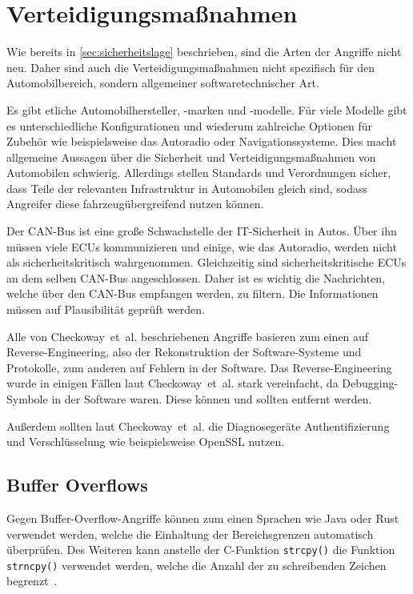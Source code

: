 \chapter{Verteidigungsmaßnahmen}\label{ch:defense}
Wie bereits in \cref{sec:sicherheitslage} beschrieben, sind die Arten der
Angriffe nicht neu. Daher sind auch die Verteidigungsmaßnahmen nicht
spezifisch für den Automobilbereich, sondern allgemeiner softwaretechnischer
Art.

Es gibt etliche Automobilhersteller, -marken und -modelle. Für viele Modelle
gibt es unterschiedliche Konfigurationen und wiederum zahlreiche Optionen für
Zubehör wie beispielsweise das Autoradio oder Navigationssysteme. Dies macht
allgemeine Aussagen über die Sicherheit und Verteidigungsmaßnahmen von
Automobilen schwierig. Allerdings stellen Standards und Verordnungen sicher,
dass Teile der relevanten Infrastruktur in Automobilen gleich sind, sodass
Angreifer diese fahrzeugübergreifend nutzen können.

Der CAN-Bus ist eine große Schwachstelle der IT-Sicherheit in Autos. Über ihn
müssen viele ECUs kommunizieren und einige, wie das Autoradio, werden nicht als
sicherheitskritisch wahrgenommen. Gleichzeitig sind sicherheitskritische ECUs an
dem selben CAN-Bus angeschlossen. Daher ist es wichtig die Nachrichten, welche
über den CAN-Bus empfangen werden, zu filtern. Die Informationen müssen auf
Plausibilität geprüft werden.

Alle von Checkoway~et~al. beschriebenen Angriffe basieren zum einen auf
Reverse-Engineering, also der Rekonstruktion der Software-Systeme und
Protokolle, zum anderen auf Fehlern in der Software. Das Reverse-Engineering
wurde in einigen Fällen laut Checkoway~et~al. stark vereinfacht, da
Debugging-Symbole in der Software waren. Diese können und sollten
entfernt werden.

Außerdem sollten laut Checkoway~et~al. die Diagnosegeräte Authentifizierung und
Verschlüsselung wie beispielsweise OpenSSL nutzen.

\section{Buffer Overflows}
Gegen Buffer-Overflow-Angriffe können zum einen Sprachen wie Java oder Rust
verwendet werden, welche die Einhaltung der Bereichsgrenzen automatisch
überprüfen. Des Weiteren kann anstelle der C-Funktion \verb+strcpy()+ die
Funktion \verb+strncpy()+ verwendet werden, welche die Anzahl der zu
schreibenden Zeichen begrenzt~\cite{Eckert2012}.

